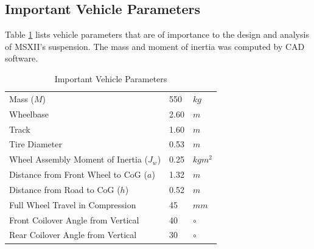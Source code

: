 \documentclass[12pt]{article}
\begin{document}
\subsection{Important Vehicle Parameters}
Table \ref{tab:params} lists vehicle parameters that are of importance to the design and analysis of MSXII's suspension. The mass and moment of inertia was computed by CAD software. 
\begin{table}[htbp]
	\centering
	\caption{Important Vehicle Parameters}
	\label{tab:params}
	\begin{tabular}{lll}
	Mass ($M$)                            	& 550  & $kg$       \\
	Wheelbase                       	 	& 2.60  & $m$  		\\
	Track                       	 		& 1.60  & $m$  		\\
	Tire Diameter                       	 		& 0.53  & $m$  		\\
	Wheel Assembly Moment of Inertia ($J_w$)   	& 0.25  & $kgm^2$  		\\
	Distance from Front Wheel to CoG ($a$)	& 1.32 & $m$  		\\
	Distance from Road to CoG ($h$)		& 0.52 & $m$  		\\
	Full Wheel Travel in Compression 	& 45   & $mm$ 		\\
	Front Coilover Angle from Vertical	& 40   & $\circ$ 	\\
	Rear Coilover Angle from Vertical	& 30   & $\circ$
	\end{tabular}
\end{table}
\end{document}
